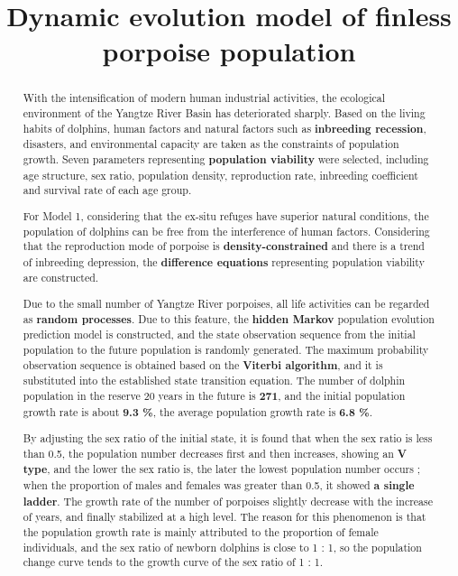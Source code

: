 \documentclass[12pt]{article}  %
\title{Dynamic evolution model of finless porpoise population}  %
\begin{document}
\begin{abstract}
With the intensification of modern human industrial activities, the ecological environment of the Yangtze River Basin has deteriorated sharply. 
 Based on the living habits of dolphins, human factors and natural factors such as \textbf{inbreeding recession}, disasters, and environmental capacity are taken as the constraints of population growth. Seven parameters representing \textbf{population viability} were selected, including age structure, sex ratio, population density, reproduction rate, inbreeding coefficient and survival rate of each age group.

For Model 1, considering that the ex-situ refuges have superior natural conditions, the population of dolphins can be free from the interference of human factors. Considering that the reproduction mode of porpoise is \textbf{density-constrained} and there is a trend of inbreeding depression, the \textbf{difference equations} representing population viability are constructed.

Due to the small number of Yangtze River porpoises, all life activities can be regarded as \textbf{random processes}. Due to this feature, the \textbf{hidden Markov} population evolution prediction model is constructed, and the state observation sequence from the initial population to the future population is randomly generated. The maximum probability observation sequence is obtained based on the \textbf{Viterbi algorithm}, and it is substituted into the established state transition equation. The number of dolphin population in the reserve 20 years in the future is \textbf{271}, and the initial population growth rate is about \textbf{9.3 \%}, the average population growth rate is \textbf{6.8 \%}.

By adjusting the sex ratio of the initial state, it is found that when the sex ratio is less than 0.5, the population number decreases first and then increases, showing an \textbf{V type}, and the lower the sex ratio is, the later the lowest population number occurs ; when the proportion of males and females was greater than 0.5, it showed \textbf{a single ladder}. The growth rate of the number of porpoises slightly decrease with the increase of years, and finally stabilized at a high level. The reason for this phenomenon is that the population growth rate is mainly attributed to the proportion of female individuals, and the sex ratio of newborn dolphins is close to 1 : 1, so the population change curve tends to the growth curve of the sex ratio of 1 : 1.


\end{abstract}
\end{document}
